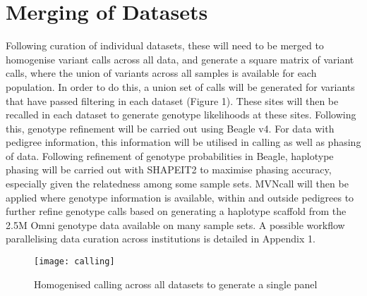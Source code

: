 \section{Merging of Datasets}

Following curation of individual datasets, these will need to be merged to homogenise variant calls across all data, and generate a square matrix of variant calls, where the union of variants across all samples is available for each population. In order to do this, a union set of calls will be generated for variants that have passed filtering in each dataset (Figure 1). These sites will then be recalled in each dataset to generate genotype likelihoods at these sites. Following this, genotype refinement will be carried out using Beagle v4. For data with pedigree information, this information will be utilised in calling as well as phasing of data. Following refinement of genotype probabilities in Beagle, haplotype phasing will be carried out with SHAPEIT2 to maximise phasing accuracy, especially given the relatedness among some sample sets. MVNcall\cite{Menelaou2013} will then be applied where genotype information is available, within and outside pedigrees to further refine genotype calls based on generating a haplotype scaffold from the 2.5M Omni genotype data available on many sample sets. A possible workflow parallelising data curation across institutions is detailed in Appendix 1. 

\begin{figure}[h]
\caption{Homogenised calling across all datasets to generate a single panel}
\centering
\texttt{[image: calling]}
\end{figure}
